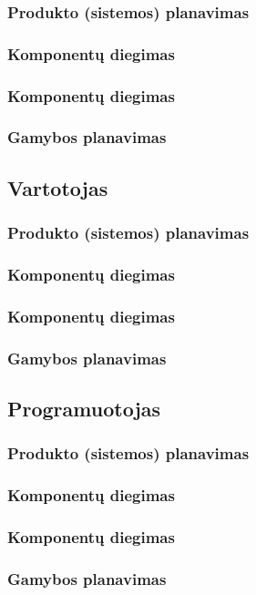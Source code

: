 \documentclass{VUMIFPSkursinis}
\begin{document}
\subsubsection{Produkto (sistemos) planavimas}
\subsubsection{Komponentų diegimas}
\subsubsection{Komponentų diegimas}
\subsubsection{Gamybos planavimas}
\subsection{Vartotojas}
\subsubsection{Produkto (sistemos) planavimas}
\subsubsection{Komponentų diegimas}
\subsubsection{Komponentų diegimas}
\subsubsection{Gamybos planavimas}
\subsection{Programuotojas}
\subsubsection{Produkto (sistemos) planavimas}
\subsubsection{Komponentų diegimas}
\subsubsection{Komponentų diegimas}
\subsubsection{Gamybos planavimas}
\end{document}
